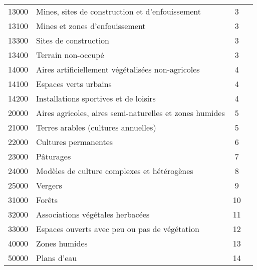 \begin{table}[ht]
\begin{tabularx}{\textwidth}{c Y c c}
		13000 & Mines, sites de construction et d'enfouissement & 3 & \\
		13100 & Mines et zones d'enfouissement & 3 & \\
		13300 & Sites de construction & 3 & \\
		13400 & Terrain non-occupé & 3 & \\
		14000 & Aires artificiellement végétalisées non-agricoles & 4 & \\
		14100 & Espaces verts urbains & 4 & \\
		14200 & Installations sportives et de loisirs & 4 & \\
		20000 & Aires agricoles, aires semi-naturelles et zones humides & 5 & \\
		21000 & Terres arables (cultures annuelles) & 5 & \\
		22000 & Cultures permanentes & 6 & \\
		23000 & Pâturages & 7 & \\
		24000 & Modèles de culture complexes et hétérogènes & 8 & \\
		25000 & Vergers & 9 & \\
		31000 & Forêts & 10 & \\
		32000 & Associations végétales herbacées & 11 & \\
		33000 & Espaces ouverts avec peu ou pas de végétation & 12 & \\
		40000 & Zones humides & 13 & \\
		50000 & Plans d'eau & 14 & \\
		\bottomrule
	\end{tabularx}
\end{table}

